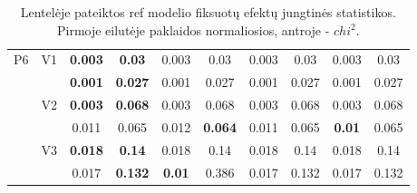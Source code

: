 \documentclass[12pt,a4paper]{article}
\begin{document}
\begin{sidewaystable}[ht]
{\begin{tabular}{cc|cc|cc|cc|cc|}
   \hline \hline\multirow{6}{*}{P6} & \multirow{2}{*}{V1} & \textbf{0.003} & \textbf{0.03} & 0.003 & 0.03 & 0.003 & 0.03 & 0.003 & 0.03 \\ 
   &  & \textbf{0.001} & \textbf{0.027} & 0.001 & 0.027 & 0.001 & 0.027 & 0.001 & 0.027 \\ 
   & \multirow{2}{*}{V2} & \textbf{0.003} & \textbf{0.068} & 0.003 & 0.068 & 0.003 & 0.068 & 0.003 & 0.068 \\ 
   &  & 0.011 & 0.065 & 0.012 & \textbf{0.064} & 0.011 & 0.065 & \textbf{0.01} & 0.065 \\ 
   & \multirow{2}{*}{V3} & \textbf{0.018} & \textbf{0.14} & 0.018 & 0.14 & 0.018 & 0.14 & 0.018 & 0.14 \\ 
   &  & 0.017 & \textbf{0.132} & \textbf{0.01} & 0.386 & 0.017 & 0.132 & 0.017 & 0.132 \\ 
   \hline
\end{tabular}
}
\caption{Lentelėje pateiktos ref modelio fiksuotų efektų jungtinės statistikos. Pirmoje eilutėje paklaidos normaliosios, antroje - $chi^2$.}
\end{sidewaystable}
\end{document}
